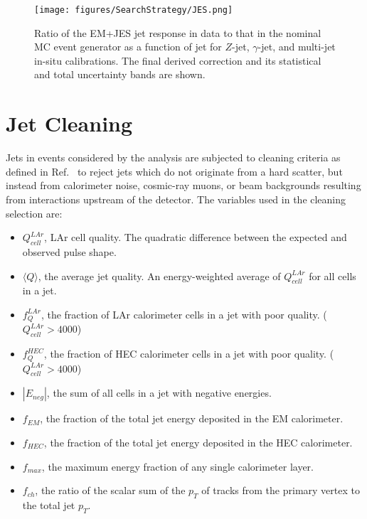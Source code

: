 \begin{figure}[ht!]
	\centering
	\texttt{[image: figures/SearchStrategy/JES.png]}
	\caption{Ratio of the EM+JES jet response in data to that in the nominal MC event generator as a function of jet \pt for $Z$-jet, $\gamma$-jet, and multi-jet in-situ calibrations.  The final derived correction and its statistical and total uncertainty bands are shown.}
	\label{fig:JES}
	
	
\end{figure}

\section{Jet Cleaning}

Jets in events considered by the analysis are subjected to cleaning criteria as defined in Ref.~\cite{JetCleaning} to reject jets which do not originate from a hard scatter, but instead from calorimeter noise, cosmic-ray muons, or beam backgrounds resulting from interactions upstream of the detector.  The variables used in the cleaning selection are:
\begin{itemize}[noitemsep]
	\item $Q^{LAr}_{cell}$, LAr cell quality.  The quadratic difference between the expected and observed pulse shape.
	\item $\langle Q \rangle$, the average jet quality. An energy-weighted average of $Q^{LAr}_{cell}$ for all cells in a jet.
	\item $f^{LAr}_{Q}$, the fraction of LAr calorimeter cells in a jet with poor quality. ($Q^{LAr}_{cell}>4000$)
	\item $f^{HEC}_{Q}$, the fraction of HEC calorimeter cells in a jet with poor quality. ($Q^{LAr}_{cell}>4000$)
	\item $|E_{neg}|$, the sum of all cells in a jet with negative energies.
    \item $f_{EM}$, the fraction of the total jet energy deposited in the EM calorimeter.
    \item $f_{HEC}$, the fraction of the total jet energy deposited in the HEC calorimeter.
    \item $f_{max}$, the maximum energy fraction of any single calorimeter layer.
    \item $f_{ch}$, the ratio of the scalar sum of the $p_T$ of tracks from the primary vertex to the total jet $p_T$.
\end{itemize}
    
